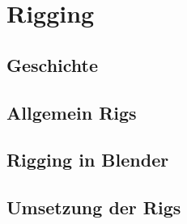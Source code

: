 \section{Rigging}
\subsection{Geschichte}
\subsection{Allgemein Rigs}
\subsection{Rigging in Blender}
\subsection{Umsetzung der Rigs}
